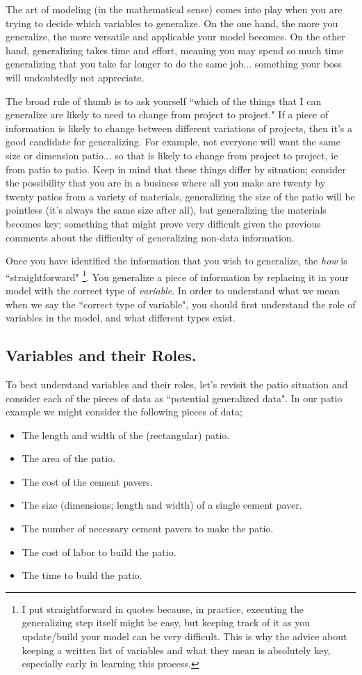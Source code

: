 The art of modeling (in the mathematical sense) comes into play when you are trying to decide which variables to generalize. On the one hand, the more you generalize, the more versatile and applicable your model becomes. On the other hand, generalizing takes time and effort, meaning you may spend so much time generalizing that you take far longer to do the same job... something your boss will undoubtedly not appreciate.

The broad rule of thumb is to ask yourself ``which of the things that I can generalize are likely to need to change from project to project." If a piece of information is likely to change between different variations of projects, then it's a good candidate for generalizing. For example, not everyone will want the same size or dimension patio... so that is likely to change from project to project, ie from patio to patio. Keep in mind that these things differ by situation; consider the possibility that you are in a business where all you make are twenty by twenty patios from a variety of materials, generalizing the size of the patio will be pointless (it's always the same size after all), but generalizing the materials becomes key; something that might prove very difficult given the previous comments about the difficulty of generalizing non-data information.

Once you have identified the information that you wish to generalize, the \textit{how} is ``straightforward"
\footnote{I put straightforward in quotes because, in practice, executing the generalizing step itself might be easy, but keeping track of it as you update/build your model can be very difficult. This is why the advice about keeping a written list of variables and what they mean is absolutely key, especially early in learning this process.}.
You generalize a piece of information by replacing it in your model with the correct type of \textit{variable}.
In order to understand what we mean when we say the ``correct type of variable", you should first understand the role of variables in the model, and what different types exist.

\subsection{Variables and their Roles.}
To best understand variables and their roles, let's revisit the patio situation and consider each of the pieces of data as ``potential generalized data". In our patio example we might consider the following pieces of data;
\begin{itemize}
\item The length and width of the (rectangular) patio.
\item The area of the patio.
\item The cost of the cement pavers.
\item The size (dimensions; length and width) of a single cement paver.
\item The number of necessary cement pavers to make the patio.
\item The cost of labor to build the patio.
\item The time to build the patio.
\end{itemize}


